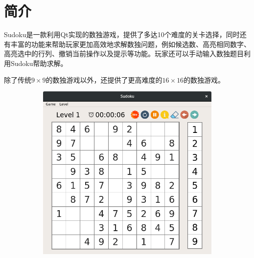 \documentclass[11pt,a4paper]{article}
\author{}
\title{}
\begin{document}
\maketitle
\section{简介}
Sudoku是一款利用Qt实现的数独游戏，提供了多达10个难度的关卡选择，同时还有丰富的功能来帮助玩家更加高效地求解数独问题，例如候选数、高亮相同数字、高亮选中的行列、撤销当前操作以及提示等功能。玩家还可以手动输入数独题目利用Sudoku帮助求解。

除了传统$9 \times 9$的数独游戏以外，还提供了更高难度的$16 \times 16$的数独游戏。

\begin{figure}[H]
	\centering
	\begin{subfigure}{.45\textwidth}
		\centering
		\includegraphics[width=\linewidth]{sudoku-3a.png}
	\end{subfigure}
	\hfill
	\begin{subfigure}{.45\textwidth}
		\centering

\end{subfigure}
\end{figure}
\end{document}
